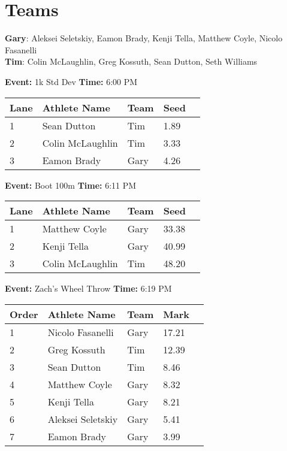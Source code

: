 \documentclass[10pt]{article}
\begin{document}
\vspace{2em}
\section*{Teams}

\textbf{Gary}: Aleksei Seletskiy, Eamon Brady, Kenji Tella, Matthew Coyle, Nicolo Fasanelli
\\\textbf{Tim}: Colin McLaughlin, Greg Kossuth, Sean Dutton, Seth Williams

\twocolumn


\textbf{Event:} 1k Std Dev \quad \textbf{Time:} 6:00 PM 

\vspace{1em}
\begin{tabular}{@{}lllll@{}}
\toprule

\textbf{Lane} & \textbf{Athlete Name} & \textbf{Team} & \textbf{Seed} \\
\midrule
1 & Sean Dutton & Tim & 1.89 &\\
2 & Colin McLaughlin & Tim & 3.33 &\\
3 & Eamon Brady & Gary & 4.26 &\\
\bottomrule
\end{tabular}
\vspace{2.5em}


\textbf{Event:} Boot 100m \quad \textbf{Time:} 6:11 PM 

\vspace{1em}
\begin{tabular}{@{}lllll@{}}
\toprule

\textbf{Lane} & \textbf{Athlete Name} & \textbf{Team} & \textbf{Seed} \\
\midrule
1 & Matthew Coyle & Gary & 33.38 &\\
2 & Kenji Tella & Gary & 40.99 &\\
3 & Colin McLaughlin & Tim & 48.20 &\\
\bottomrule
\end{tabular}
\vspace{2.5em}


\textbf{Event:} Zach's Wheel Throw \quad \textbf{Time:} 6:19 PM 

\vspace{1em}
\begin{tabular}{@{}lllll@{}}
\toprule

\textbf{Order} & \textbf{Athlete Name} & \textbf{Team} & \textbf{Mark} \\
\midrule
1 & Nicolo Fasanelli & Gary & 17.21 &\\
2 & Greg Kossuth & Tim & 12.39 &\\
3 & Sean Dutton & Tim & 8.46 &\\
4 & Matthew Coyle & Gary & 8.32 &\\
5 & Kenji Tella & Gary & 8.21 &\\
6 & Aleksei Seletskiy & Gary & 5.41 &\\
7 & Eamon Brady & Gary & 3.99 &\\
\bottomrule
\end{tabular}
\vspace{2.5em}
\end{document}
